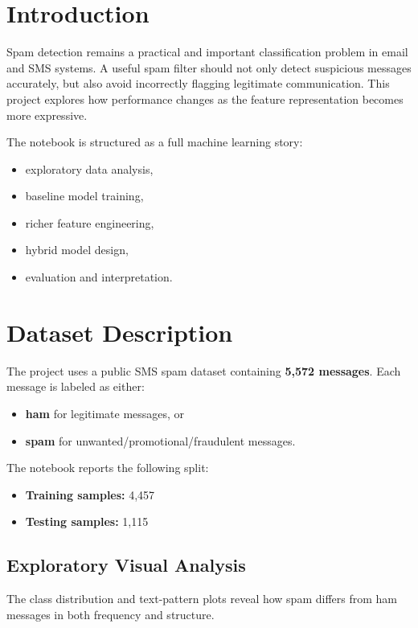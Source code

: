 \documentclass[12pt,a4paper]{article}
\begin{document}
\section{Introduction}
Spam detection remains a practical and important classification problem in email and SMS systems. A useful spam filter should not only detect suspicious messages accurately, but also avoid incorrectly flagging legitimate communication. This project explores how performance changes as the feature representation becomes more expressive.

The notebook is structured as a full machine learning story:
\begin{itemize}[leftmargin=1.5em]
    \item exploratory data analysis,
    \item baseline model training,
    \item richer feature engineering,
    \item hybrid model design,
    \item evaluation and interpretation.
\end{itemize}

\section{Dataset Description}
The project uses a public SMS spam dataset containing \textbf{5,572 messages}. Each message is labeled as either:
\begin{itemize}[leftmargin=1.5em]
    \item \textbf{ham} for legitimate messages, or
    \item \textbf{spam} for unwanted/promotional/fraudulent messages.
\end{itemize}

The notebook reports the following split:
\begin{itemize}[leftmargin=1.5em]
    \item \textbf{Training samples:} 4,457
    \item \textbf{Testing samples:} 1,115
\end{itemize}

\subsection{Exploratory Visual Analysis}
The class distribution and text-pattern plots reveal how spam differs from ham messages in both frequency and structure.
\end{document}
